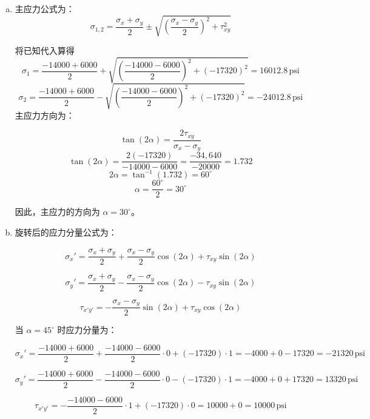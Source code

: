 \begin{enumerate}[(a)]
    \item 
    主应力公式为：
    \[\sigma_{1,2} = \frac{\sigma_x + \sigma_y}{2} \pm \sqrt{\left( \frac{\sigma_x - \sigma_y}{2} \right)^2 + \tau_{xy}^2}\]

    将已知代入算得
    \[\sigma_1 = \frac{-14000 + 6000}{2} + \sqrt{\left( \frac{-14000 - 6000}{2} \right)^2 +{(-17320)}^2 } = 16012.8 \, \text{psi}\]
    \[\sigma_2 = \frac{-14000 + 6000}{2} - \sqrt{\left( \frac{-14000 - 6000}{2} \right)^2 +{(-17320)}^2} = -24012.8 \, \text{psi}\]
    主应力方向为：

    \[\tan(2\alpha) = \frac{2\tau_{xy}}{\sigma_x - \sigma_y}\]
    \[\tan(2\alpha) = \frac{2(-17320)}{-14000 - 6000} = \frac{-34,640}{-20000} = 1.732\]
    \[2\alpha = \tan^{-1}(1.732) = 60^\circ\]
    \[\alpha = \frac{60^\circ}{2} = 30^\circ\]

    因此，主应力的方向为 \( \alpha = 30^\circ \)。
    \item 
    旋转后的应力分量公式为：

    \[\sigma_x' = \frac{\sigma_x + \sigma_y}{2} + \frac{\sigma_x - \sigma_y}{2} \cos(2\alpha) + \tau_{xy} \sin(2\alpha)\]

    \[\sigma_y' = \frac{\sigma_x + \sigma_y}{2} - \frac{\sigma_x - \sigma_y}{2} \cos(2\alpha) - \tau_{xy} \sin(2\alpha)\]

    \[\tau_{x'y'} = -\frac{\sigma_x - \sigma_y}{2} \sin(2\alpha) + \tau_{xy} \cos(2\alpha)\]

    当 \( \alpha = 45^\circ \) 时应力分量为：

    \[\sigma_x' = \frac{-14000 + 6000}{2} + \frac{-14000 - 6000}{2} \cdot 0 + (-17320) \cdot 1 = -4000 + 0 - 17320 = -21320 \, \text{psi}\]

    \[\sigma_y' = \frac{-14000 + 6000}{2} - \frac{-14000 - 6000}{2} \cdot 0 - (-17320) \cdot 1 = -4000 + 0 + 17320 = 13320 \, \text{psi}\]

    \[\tau_{x'y'} = -\frac{-14000 - 6000}{2} \cdot 1 + (-17320) \cdot 0 = 10000 + 0 = 10000 \, \text{psi}\]
\end{enumerate}